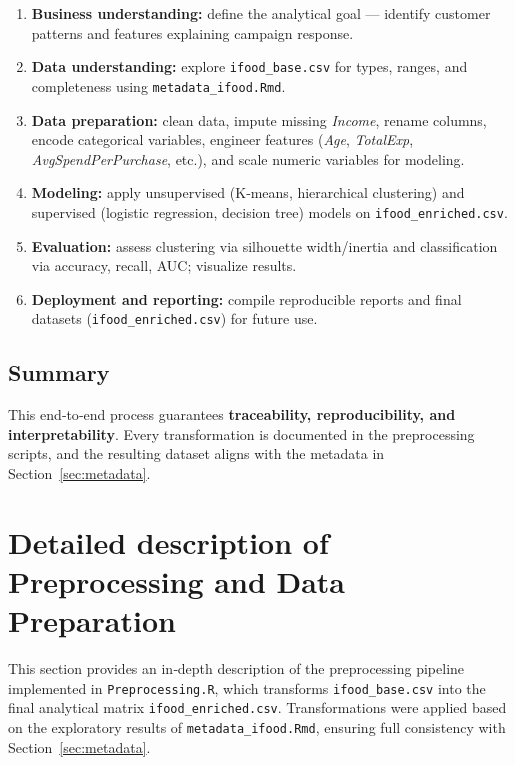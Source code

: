 \begin{enumerate}
    \item \textbf{Business understanding:} define the analytical goal --- identify customer patterns and features explaining campaign response.
    \item \textbf{Data understanding:} explore \texttt{ifood\_base.csv} for types, ranges, and completeness using \texttt{metadata\_ifood.Rmd}.
    \item \textbf{Data preparation:} clean data, impute missing \textit{Income}, rename columns, encode categorical variables, engineer features (\textit{Age}, \textit{TotalExp}, \textit{AvgSpendPerPurchase}, etc.), and scale numeric variables for modeling.
    \item \textbf{Modeling:} apply unsupervised (K‐means, hierarchical clustering) and supervised (logistic regression, decision tree) models on \texttt{ifood\_enriched.csv}.
    \item \textbf{Evaluation:} assess clustering via silhouette width/inertia and classification via accuracy, recall, AUC; visualize results.
    \item \textbf{Deployment and reporting:} compile reproducible reports and final datasets (\texttt{ifood\_enriched.csv}) for future use.
\end{enumerate}

\subsection{Summary}

This end‐to‐end process guarantees \textbf{traceability, reproducibility, and
interpretability}. Every transformation is documented in the preprocessing scripts,
and the resulting dataset aligns with the metadata in Section~\ref{sec:metadata}.


\newpage
\section{Detailed description of Preprocessing and Data Preparation}

This section provides an in‐depth description of the preprocessing pipeline
implemented in \texttt{Preprocessing.R}, which transforms
\texttt{ifood\_base.csv} into the final analytical matrix
\texttt{ifood\_enriched.csv}.  
Transformations were applied based on the exploratory results of
\texttt{metadata\_ifood.Rmd}, ensuring full consistency with Section~\ref{sec:metadata}.

